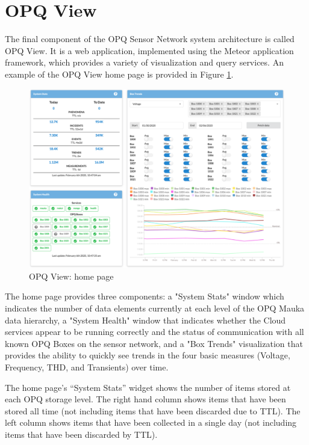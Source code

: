 \section{OPQ View}
\label{sec:opq-view}

The final component of the OPQ Sensor Network system architecture is called OPQ View. It is a web application, implemented using the Meteor application framework, which provides a variety of visualization and query services.  An example of the OPQ View home page is provided in Figure \ref{fig:opq-view-home}.

\begin{figure}
\center \includegraphics[width=5in]{images/view/homepage.png}
\caption{OPQ View: home page}
\label{fig:opq-view-home}
\end{figure}

The home page provides three components:  a "System Stats" window which indicates the number of data elements currently at each level of the OPQ Mauka data hierarchy, a "System Health" window that indicates whether the Cloud services appear to be running correctly and the status of communication with all known OPQ Boxes on the sensor network, and a "Box Trends" visualization that provides the ability to quickly see trends in the four basic measures (Voltage, Frequency, THD, and Transients) over time.

The home page's ``System Stats'' widget shows the number of items stored at each OPQ storage level. The right hand column shows items that have been stored all time (not including items that have been discarded due to TTL). The left column shows items that have been collected in a single day (not including items that have been discarded by TTL).

